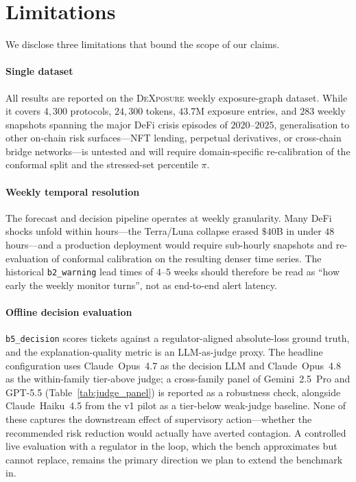 \section{Limitations}
\label{sec:limitations}

We disclose three limitations that bound the scope of our claims.

\paragraph{Single dataset} All results are reported on the \textsc{DeXposure} weekly exposure-graph dataset. While it covers $4{,}300$ protocols, $24{,}300$ tokens, $43.7$M exposure entries, and $283$ weekly snapshots spanning the major DeFi crisis episodes of $2020$--$2025$, generalisation to other on-chain risk surfaces---NFT lending, perpetual derivatives, or cross-chain bridge networks---is untested and will require domain-specific re-calibration of the conformal split and the stressed-set percentile $\pi$.

\paragraph{Weekly temporal resolution} The forecast and decision pipeline operates at weekly granularity. Many DeFi shocks unfold within hours---the Terra/Luna collapse erased $\$40$B in under $48$ hours---and a production deployment would require sub-hourly snapshots and re-evaluation of conformal calibration on the resulting denser time series. The historical \texttt{b2\_warning} lead times of $4$--$5$ weeks should therefore be read as ``how early the weekly monitor turns'', not as end-to-end alert latency.

\paragraph{Offline decision evaluation} \texttt{b5\_decision} scores tickets against a regulator-aligned absolute-loss ground truth, and the explanation-quality metric is an LLM-as-judge proxy. The headline configuration uses Claude~Opus~4.7 as the decision LLM and Claude~Opus~4.8 as the within-family tier-above judge; a cross-family panel of Gemini~2.5~Pro and GPT-5.5 (Table~\ref{tab:judge_panel}) is reported as a robustness check, alongside Claude~Haiku~4.5 from the v1 pilot as a tier-below weak-judge baseline. None of these captures the downstream effect of supervisory action---whether the recommended risk reduction would actually have averted contagion. A controlled live evaluation with a regulator in the loop, which the bench approximates but cannot replace, remains the primary direction we plan to extend the benchmark in.


